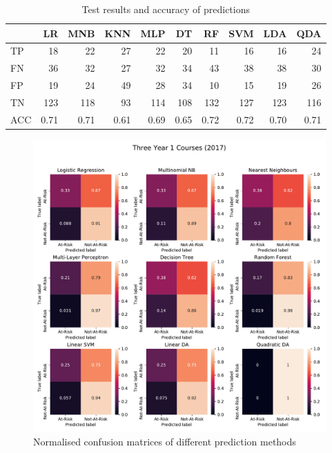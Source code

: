 \documentclass[a4paper]{report}
\begin{document}
\begin{table}[H]
  \centering
  \begin{tabular}{lrrrrrrrrr}
    \toprule
    {} &   LR &  MNB &  KNN &  MLP &   DT &   RF &  SVM &  LDA &  QDA \\
    \midrule
    TP  &   18 &   22 &   27 &   22 &   20 &   11 &   16 &   16 &   24 \\
    FN  &   36 &   32 &   27 &   32 &   34 &   43 &   38 &   38 &   30 \\
    FP  &   19 &   24 &   49 &   28 &   34 &   10 &   15 &   19 &   26 \\
    TN  &  123 &  118 &   93 &  114 &  108 &  132 &  127 &  123 &  116 \\
    ACC & 0.71 & 0.71 & 0.61 & 0.69 & 0.65 & 0.72 & 0.72 & 0.70 & 0.71 \\
    \bottomrule
  \end{tabular}
  \caption{\label{tab:ML_PPS_bin_Qual_17}Test results and accuracy of predictions}
\end{table}

\begin{figure}[H]
  \centering
  \includegraphics[width=\linewidth]{fig/ML_Y1Fs_bin_Qual_17.pdf}
  \caption{\label{fig:ML_Y1Fs_bin_Qual_17}Normalised confusion matrices of different prediction methods}
\end{figure}
\end{document}
